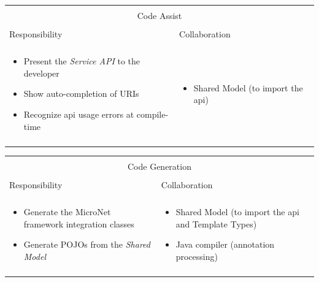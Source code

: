 \vspace{0.5cm} \noindent      
\begin{tabular}{|l|l|}
    \cline{1-2}
    \multicolumn{2}{|c|}{} \\[-0.3cm]
    \multicolumn{2}{|c|}{Code Assist} \\ 
    \multicolumn{2}{|c|}{} \\[-0.3cm]
    \cline{1-2}
    Responsibility & Collaboration \\
    \cline{1-2}
    & \\[-0.2cm]
    \begin{minipage}{0.47\textwidth}
        \begin{itemize}
          \item Present the \textit{Service API} to the developer
          \item Show auto-completion of URIs
          \item Recognize \gls{api} usage errors at compile-time
        \end{itemize} 
    \end{minipage}
	&
    \begin{minipage}{0.47\textwidth}
        \begin{itemize}
          \item Shared Model (to import the \gls{api})
        \end{itemize} 
    \end{minipage}
	\\ & \\
    \hline
\end{tabular}

\vspace{0.5cm} \noindent         
\begin{tabular}{|l|l|}
    \cline{1-2}
    \multicolumn{2}{|c|}{} \\[-0.3cm]
    \multicolumn{2}{|c|}{Code Generation} \\ 
    \multicolumn{2}{|c|}{} \\[-0.3cm]
    \cline{1-2}
    Responsibility & Collaboration \\
    \cline{1-2}
    & \\[-0.2cm]
    \begin{minipage}{0.47\textwidth}
        \begin{itemize}
          \item Generate the MicroNet framework integration classes
          \item Generate POJOs from the \textit{Shared Model}
        \end{itemize} 
    \end{minipage}
	&
    \begin{minipage}{0.47\textwidth}
        \begin{itemize}
          \item Shared Model (to import the \gls{api} and Template Types)
          \item Java compiler (annotation processing)
        \end{itemize} 
    \end{minipage}
	\\ & \\
    \hline
\end{tabular}

